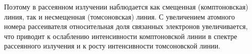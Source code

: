 Поэтому в рассеянном излучении наблюдается как смещенная
(комптоновская) линия, так и несмещенная (томсоновская) линия.
С увеличением атомного номера рассеивателя относительная доля
связанных электронов увеличивается, что приводит к ослаблению
интенсивности комптоновской линии в спектре рассеянного 
излучения и к росту интенсивности томсоновской линии.

